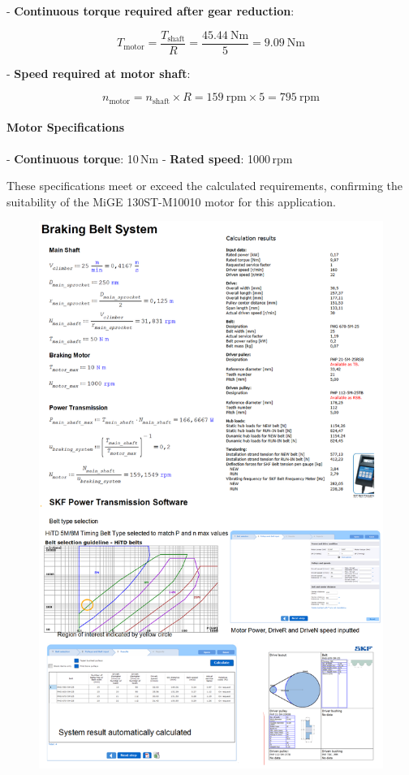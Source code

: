 - \textbf{Continuous torque required after gear reduction}:

\[
T_{\text{motor}} = \frac{T_{\text{shaft}}}{R} = \frac{45.44\ \text{Nm}}{5} = 9.09\ \text{Nm}
\]

- \textbf{Speed required at motor shaft}:

\[
n_{\text{motor}} = n_{\text{shaft}} \times R = 159\ \text{rpm} \times 5 = 795\ \text{rpm}
\]

\paragraph{Motor Specifications}

- \textbf{Continuous torque}: 10\,Nm
- \textbf{Rated speed}: 1000\,rpm

These specifications meet or exceed the calculated requirements, confirming the suitability of the MiGE 130ST-M10010 motor for this application.

\begin{figure}[H]
    \centering
    \includegraphics[width=1\linewidth]{chaps-append/calcs/belt_selection.png}
\end{figure}

